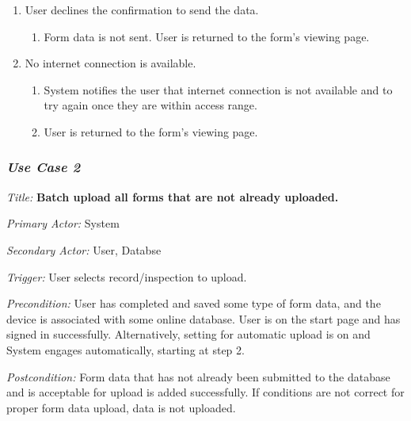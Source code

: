 \documentclass[twoside,letterpaper]{article}
\begin{document}
\begin{enumerate}
\item User declines the confirmation to send the data.
\begin{enumerate}
\item Form data is not sent. User is returned to the form's viewing page.
\end{enumerate}

\item No internet connection is available.
\begin{enumerate}
\item System notifies the user that internet connection is not available and to try again once they are within access range.
\item User is returned to the form's viewing page.
\end{enumerate}
\end{enumerate}

\subsubsection{\textit{Use Case 2}}

\textit{Title: }{\bfseries\color{black}Batch upload all forms that are not already uploaded.}

{\color{black} \textit{Primary Actor:} System}

{\color{black} \textit{Secondary Actor:} User, Databse}

{\color{black} \textit{Trigger:} User selects record/inspection to upload.}

{\color{black} \textit{Precondition:}  User has completed and saved some type of form data, and the device is associated with some online database. User is on the start page and has signed in successfully. Alternatively, setting for automatic upload is on and System engages automatically, starting at step 2.}

{\color{black} \textit{Postcondition:} Form data that has not already been submitted to the database and is acceptable for upload is added successfully. If conditions are not correct for proper form data upload, data is not uploaded.}
\end{document}

